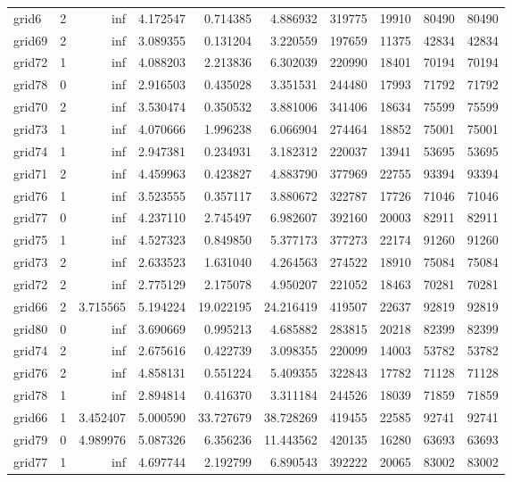 \begin{longtable}{|l|r|r|r|r|r|r|r|r|r|}
grid6 & 2 & inf & 4.172547 & 0.714385 & 4.886932 & 319775 & 19910 & 80490 & 80490 \\
grid69 & 2 & inf & 3.089355 & 0.131204 & 3.220559 & 197659 & 11375 & 42834 & 42834 \\
grid72 & 1 & inf & 4.088203 & 2.213836 & 6.302039 & 220990 & 18401 & 70194 & 70194 \\
grid78 & 0 & inf & 2.916503 & 0.435028 & 3.351531 & 244480 & 17993 & 71792 & 71792 \\
grid70 & 2 & inf & 3.530474 & 0.350532 & 3.881006 & 341406 & 18634 & 75599 & 75599 \\
grid73 & 1 & inf & 4.070666 & 1.996238 & 6.066904 & 274464 & 18852 & 75001 & 75001 \\
grid74 & 1 & inf & 2.947381 & 0.234931 & 3.182312 & 220037 & 13941 & 53695 & 53695 \\
grid71 & 2 & inf & 4.459963 & 0.423827 & 4.883790 & 377969 & 22755 & 93394 & 93394 \\
grid76 & 1 & inf & 3.523555 & 0.357117 & 3.880672 & 322787 & 17726 & 71046 & 71046 \\
grid77 & 0 & inf & 4.237110 & 2.745497 & 6.982607 & 392160 & 20003 & 82911 & 82911 \\
grid75 & 1 & inf & 4.527323 & 0.849850 & 5.377173 & 377273 & 22174 & 91260 & 91260 \\
grid73 & 2 & inf & 2.633523 & 1.631040 & 4.264563 & 274522 & 18910 & 75084 & 75084 \\
grid72 & 2 & inf & 2.775129 & 2.175078 & 4.950207 & 221052 & 18463 & 70281 & 70281 \\
grid66 & 2 & 3.715565 & 5.194224 & 19.022195 & 24.216419 & 419507 & 22637 & 92819 & 92819 \\
grid80 & 0 & inf & 3.690669 & 0.995213 & 4.685882 & 283815 & 20218 & 82399 & 82399 \\
grid74 & 2 & inf & 2.675616 & 0.422739 & 3.098355 & 220099 & 14003 & 53782 & 53782 \\
grid76 & 2 & inf & 4.858131 & 0.551224 & 5.409355 & 322843 & 17782 & 71128 & 71128 \\
grid78 & 1 & inf & 2.894814 & 0.416370 & 3.311184 & 244526 & 18039 & 71859 & 71859 \\
grid66 & 1 & 3.452407 & 5.000590 & 33.727679 & 38.728269 & 419455 & 22585 & 92741 & 92741 \\
grid79 & 0 & 4.989976 & 5.087326 & 6.356236 & 11.443562 & 420135 & 16280 & 63693 & 63693 \\
grid77 & 1 & inf & 4.697744 & 2.192799 & 6.890543 & 392222 & 20065 & 83002 & 83002 \\

\end{longtable}
